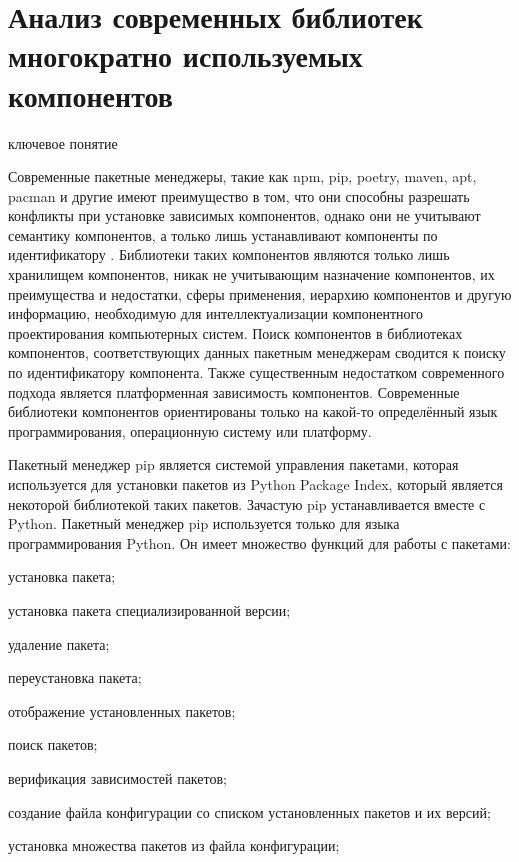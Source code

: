 \section{Анализ современных библиотек многократно используемых компонентов}
\label{ostis_library_analysis}

\begin{SCn}
\begin{scnrelfromlist}{ключевое понятие}
\end{scnrelfromlist}
\end{SCn}

\bigskip

Современные пакетные менеджеры, такие как npm, pip, poetry, maven, apt, pacman и другие имеют преимущество в том, что они способны разрешать конфликты при установке зависимых компонентов, однако они не учитывают семантику компонентов, а только лишь устанавливают компоненты по идентификатору . Библиотеки таких компонентов являются только лишь хранилищем компонентов, никак не учитывающим назначение компонентов, их преимущества и недостатки, сферы применения, иерархию компонентов и другую информацию, необходимую для интеллектуализации компонентного проектирования компьютерных систем. Поиск компонентов в библиотеках компонентов, соответствующих данных пакетным менеджерам сводится к поиску по идентификатору компонента. Также существенным недостатком современного подхода является платформенная зависимость компонентов. Современные библиотеки компонентов ориентированы только на какой-то определённый язык программирования, операционную систему или платформу.

Пакетный менеджер pip является системой управления пакетами, которая используется для установки пакетов из Python Package Index, который является некоторой библиотекой таких пакетов. Зачастую pip устанавливается вместе с Python. Пакетный менеджер pip используется только для языка программирования Python. 
Он имеет множество функций для работы с пакетами:

\begin{textitemize}
	\item установка пакета;
	\item установка пакета специализированной версии;
	\item удаление пакета;
	\item переустановка пакета;
	\item отображение установленных пакетов;
	\item поиск пакетов;
	\item верификация зависимостей пакетов;
	\item создание файла конфигурации со списком установленных пакетов и их версий;
	\item установка множества пакетов из файла конфигурации;
\end{textitemize}


